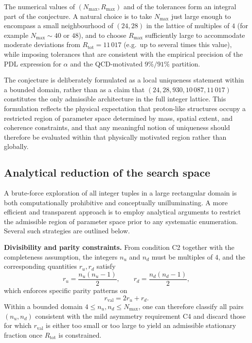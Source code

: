 \documentclass[11pt,a4paper]{article}
\begin{document}
The numerical values of $(N_{\max},R_{\max})$ and of the tolerances form an integral part of the conjecture. A natural choice is to take $N_{\max}$ just large enough to encompass a small neighbourhood of $(24,28)$ in the lattice of multiples of $4$ (for example $N_{\max}\sim 40$ or $48$), and to choose $R_{\max}$ sufficiently large to accommodate moderate deviations from $R_{\mathrm{tot}}=11\,017$ (e.g.\ up to several times this value), while imposing tolerances that are consistent with the empirical precision of the PDL expression for $\alpha$ and the QCD-motivated $9\%/91\%$ partition.\cite{LaubscherPDLFull2026,LaubscherIMRadPDL2026,LaubscherDerivationAlpha2026}

The conjecture is deliberately formulated as a local uniqueness statement within a bounded domain, rather than as a claim that $(24,28,930,10\,087,11\,017)$ constitutes the only admissible architecture in the full integer lattice. This formulation reflects the physical expectation that proton-like structures occupy a restricted region of parameter space determined by mass, spatial extent, and coherence constraints, and that any meaningful notion of uniqueness should therefore be evaluated within that physically motivated region rather than globally.

\subsection{Analytical reduction of the search space}

A brute-force exploration of all integer tuples in a large rectangular domain is both computationally prohibitive and conceptually unilluminating. A more efficient and transparent approach is to employ analytical arguments to restrict the admissible region of parameter space prior to any systematic enumeration. Several such strategies are outlined below.

\medskip
\noindent\textbf{Divisibility and parity constraints.} From condition C2 together with the completeness assumption, the integers $n_u$ and $n_d$ must be multiples of $4$, and the corresponding quantities $r_u,r_d$ satisfy
\begin{equation}
r_u = \frac{n_u(n_u-1)}{2},\qquad r_d = \frac{n_d(n_d-1)}{2},
\end{equation}
which enforces specific parity patterns on
\begin{equation}
r_{\mathrm{val}} = 2r_u + r_d.
\end{equation}
Within a bounded domain $4 \leq n_u,n_d \leq N_{\max}$, one can therefore classify all pairs $(n_u,n_d)$ consistent with the mild asymmetry requirement C4 and discard those for which $r_{\mathrm{val}}$ is either too small or too large to yield an admissible stationary fraction once $R_{\mathrm{tot}}$ is constrained.\cite{LaubscherLDP2026,LaubscherIMRadPDL2026}
\end{document}
